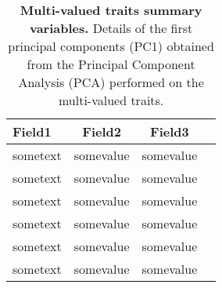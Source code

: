 
\newpage

\begin{table}[h]
\centering
\caption{\textbf{Multi-valued traits summary variables.} Details of the first principal components (PC1) obtained from the Principal Component Analysis (PCA) performed on the multi-valued traits.}
\begin{scriptsize}
\begin{tabular}{l c c c}
\hline
\textbf{Field1} & \textbf{Field2} & \textbf{Field3} \\
 \hline
sometext & somevalue & somevalue\\
sometext & somevalue & somevalue\\
sometext & somevalue & somevalue\\
sometext & somevalue & somevalue\\
sometext & somevalue & somevalue\\
sometext & somevalue & somevalue\\
\hline
\end{tabular}
\end{scriptsize}
\label{table:2.2-1}
\end{table}

